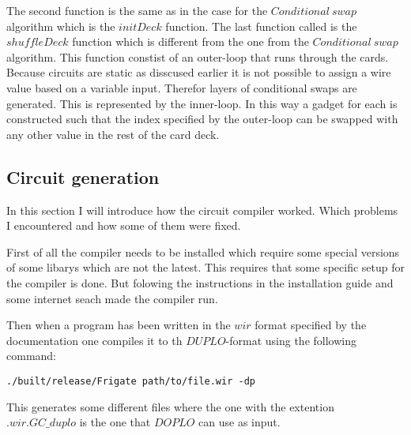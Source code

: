 The second function is the same as in the case for the $Conditional~swap$ algorithm which is the $initDeck$ function. The last function called is the $shuffleDeck$ function which is different from the one from the $Conditional~swap$ algorithm. This function constist of an outer-loop that runs through the cards. Because circuits are static as disscused earlier it is not possible to assign a wire value based on a variable input. Therefor layers of conditional swaps are generated. This is represented by the inner-loop. In this way a gadget for each is constructed such that the index specified by the outer-loop can be swapped with any other value in the rest of the card deck.


\subsection{Circuit generation}
In this section I will introduce how the circuit compiler worked. Which problems I encountered and how some of them were fixed. 

First of all the compiler needs to be installed which require some special versions of some libarys which are not the latest. This requires that some specific setup for the compiler is done. But folowing the instructions in the installation guide and some internet seach made the compiler run.

Then when a program has been written in the $wir$ format specified by the documentation one compiles it to th $DUPLO$-format using the following command:

\begin{center}
\begin{verbatim}
./built/release/Frigate path/to/file.wir -dp
\end{verbatim}
\end{center}

This generates some different files where the one with the extention $.wir.GC\_duplo$ is the one that $DOPLO$ can use as input.

\bigskip

